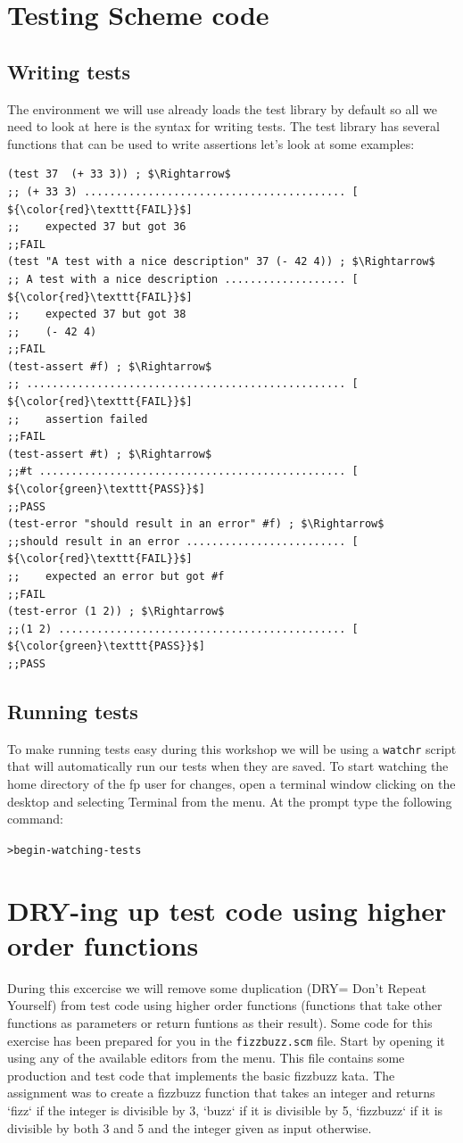\documentclass[12pt,a4paper,english,twoside]{article}
\begin{document}
\section{Testing Scheme code}
\subsection{Writing tests}
The environment we will use already loads the test library by default so all 
we need to look at here is the syntax for writing tests. The test library 
has several functions that can be used to write assertions let's look at some 
examples:
\begin{lstlisting}
(test 37  (+ 33 3)) ; $\Rightarrow$ 
;; (+ 33 3) ......................................... [ ${\color{red}\texttt{FAIL}}$]
;;    expected 37 but got 36
;;FAIL
(test "A test with a nice description" 37 (- 42 4)) ; $\Rightarrow$
;; A test with a nice description ................... [ ${\color{red}\texttt{FAIL}}$]
;;    expected 37 but got 38
;;    (- 42 4)
;;FAIL
(test-assert #f) ; $\Rightarrow$
;; .................................................. [ ${\color{red}\texttt{FAIL}}$]
;;    assertion failed
;;FAIL
(test-assert #t) ; $\Rightarrow$
;;#t ................................................ [ ${\color{green}\texttt{PASS}}$]
;;PASS
(test-error "should result in an error" #f) ; $\Rightarrow$
;;should result in an error ......................... [ ${\color{red}\texttt{FAIL}}$]
;;    expected an error but got #f
;;FAIL
(test-error (1 2)) ; $\Rightarrow$
;;(1 2) ............................................. [ ${\color{green}\texttt{PASS}}$]
;;PASS
\end{lstlisting}
\subsection{Running tests}
To make running tests easy during this workshop we will be using a 
\texttt{watchr} script that will automatically run our tests when they are 
saved. To start watching the home directory of the fp user for changes, open a 
terminal window clicking on the desktop and selecting Terminal from the menu. 
At the prompt type the following command:
\begin{alltt}
> begin-watching-tests
\end{alltt}
\section{DRY-ing up test code using higher order functions}
During this excercise we will remove some duplication (DRY= Don't Repeat 
Yourself) from test code using higher order functions (functions that take 
other functions as parameters or return funtions as their result). Some code 
for this exercise has been prepared for you in the \texttt{fizzbuzz.scm} file. 
Start by opening it using any of the available editors from the menu. This 
file contains some production and test code that implements the basic fizzbuzz 
kata. The assignment was to create a fizzbuzz function that takes an integer 
and returns `fizz` if the integer is divisible by 3, `buzz` if it is divisible 
by 5, `fizzbuzz` if it is divisible by both 3 and 5 and the integer given as 
input otherwise.
\end{document}
